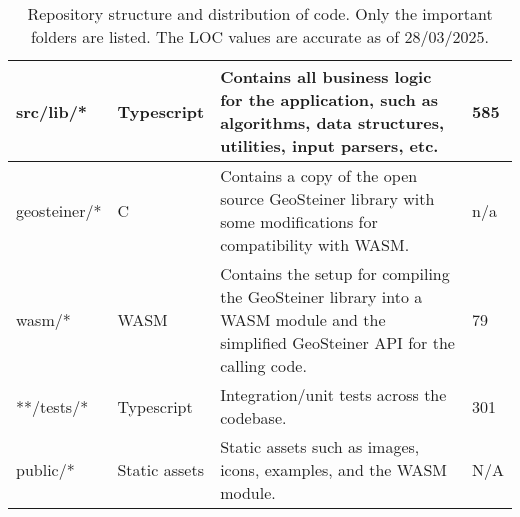 \begin{table}[h]
\begin{tabular}{|p{5cm}|p{1.5cm}|p{6cm}|p{1cm}|}
        \hline
        \rowcolor{typescriptLight}
        src/lib/*                             & Typescript    & Contains all business logic for the application, such as algorithms, data structures, utilities, input parsers, etc.                                               & 585          \\
        \hline
        \rowcolor{cLight}
        geosteiner/*                          & C             & Contains a copy of the open source GeoSteiner library with some modifications for compatibility with WASM.                                                         & n/a          \\
        \hline
        \rowcolor{wasmLight}
        wasm/*                                & WASM          & Contains the setup for compiling the GeoSteiner library into a WASM module and the simplified GeoSteiner API for the calling code.                                 & 79           \\
        \hline
        \rowcolor{testLight}
        **/tests/*                            & Typescript    & Integration/unit tests across the codebase.                                                                                                                        & 301          \\
        \hline
        \rowcolor{staticLight}
        public/*                              & Static assets & Static assets such as images, icons, examples, and the WASM module.                                                                                                & N/A          \\
        \hline
    \end{tabular}
    \caption{Repository structure and distribution of code. Only the important folders are listed. The LOC values are accurate as of 28/03/2025.}
    \label{tab:project_structure}
\end{table}